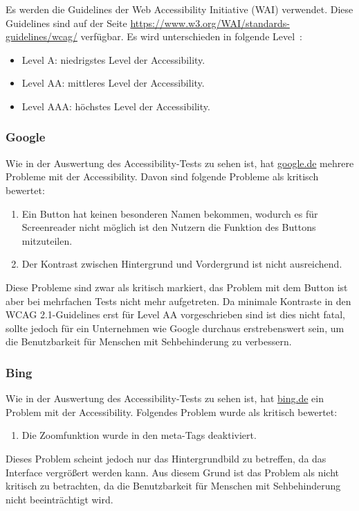 Es werden die Guidelines der Web Accessibility Initiative (WAI) verwendet.
Diese Guidelines sind auf der Seite \url{https://www.w3.org/WAI/standards-guidelines/wcag/} verfügbar.\newline
Es wird unterschieden in folgende Level~\autocite{WCAG21}:
\begin{itemize}
    \item Level A: niedrigstes Level der Accessibility.
    \item Level AA: mittleres Level der Accessibility.
    \item Level AAA: höchstes Level der Accessibility.
\end{itemize}

\subsubsection{Google}\label{subsubsec:google}
Wie in der Auswertung des Accessibility-Tests zu sehen ist, hat \url{google.de} mehrere Probleme mit der Accessibility.
Davon sind folgende Probleme als kritisch bewertet:
\begin{enumerate}
    \item Ein Button hat keinen besonderen Namen bekommen, wodurch es für Screenreader nicht möglich ist den Nutzern die Funktion des Buttons mitzuteilen.
    \item Der Kontrast zwischen Hintergrund und Vordergrund ist nicht ausreichend.
\end{enumerate}
Diese Probleme sind zwar als kritisch markiert, das Problem mit dem Button ist aber bei mehrfachen Tests nicht mehr aufgetreten.
Da minimale Kontraste in den \ac{WCAG} 2.1-Guidelines erst für Level AA vorgeschrieben sind ist dies nicht fatal, sollte jedoch für ein Unternehmen wie Google durchaus erstrebenswert sein,
um die Benutzbarkeit für Menschen mit Sehbehinderung zu verbessern.

\subsubsection{Bing}\label{subsubsec:bing}
Wie in der Auswertung des Accessibility-Tests zu sehen ist, hat \url{bing.de} ein Problem mit der Accessibility.
Folgendes Problem wurde als kritisch bewertet:
\begin{enumerate}
    \item Die Zoomfunktion wurde in den meta-Tags deaktiviert.
\end{enumerate}
Dieses Problem scheint jedoch nur das Hintergrundbild zu betreffen, da das Interface vergrößert werden kann.
Aus diesem Grund ist das Problem als nicht kritisch zu betrachten, da die Benutzbarkeit für Menschen mit Sehbehinderung nicht beeinträchtigt wird.

